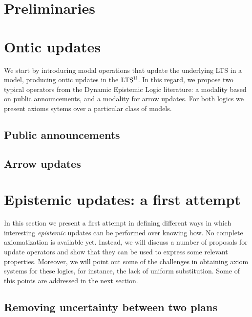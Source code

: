 \documentclass[sn-mathphys-num]{sn-jnl}%
\begin{document}
\section{Preliminaries}
\label{sec:basic}




\section{Ontic updates}
\label{sec:ontic}

We start by introducing modal operations that update the underlying LTS in a model, producing ontic updates in the $\textup{LTS$^\text{\textup{U}}$}$. In this regard, we propose two typical operators from the Dynamic Epistemic Logic literature: a modality based on public announcements, and a modality for arrow updates. For both logics we present axioms sytems over a particular class of models.

\subsection{Public announcements}
\label{sec:pal}


\subsection{Arrow updates}
\label{sec:aul}


\section{Epistemic updates: a first attempt}
\label{sec:epistemic-basic} 

In this section we present a first attempt in defining different  
ways in which interesting \emph{epistemic} updates can be performed over knowing how. No complete axiomatization is
available yet.  Instead, we will discuss a number of proposals for update
operators and show that they can be used to express some relevant properties.
Moreover, we will point out some of the challenges in obtaining axiom systems for these logics, for instance, the lack of uniform substitution. Some of this points are addressed in the next section.

\subsection{Removing uncertainty between two plans}
\label{sec:ref}

\end{document}
